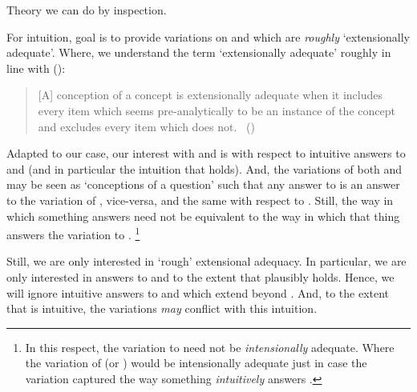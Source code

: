 \begin{note}
  Theory we can do by inspection.
\end{note}

\begin{note}
  For intuition, goal is to provide variations on \qWhy{} and \qHow{} which are \emph{roughly} `extensionally adequate'.
  Where, we understand the term `extensionally adequate' roughly in line with \citeauthor{Sumner:1987aa} (\citeyear{Sumner:1987aa}):

  \begin{quote}
    [A] conception of a concept is extensionally adequate when it includes every item which seems pre-analytically to be an instance of the concept and excludes every item which does not.%
    \mbox{ }\hfill\mbox{(\citeyear[49]{Sumner:1987aa})}
  \end{quote}

  Adapted to our case, our interest with \qWhy{} and \qHow{} is with respect to intuitive answers to \qWhy{} and \qHow{} (and in particular the intuition that \issueInclusion{} holds).
  And, the variations of both \qWhy{} and \qHow{} may be seen as `conceptions of a question' such that any answer to \qWhy{} is an answer to the variation of \qWhy{}, vice-versa, and the same with respect to \qHow{}.
  Still, the way in which something answers \qWhy{} need not be equivalent to the way in which that thing answers the variation to \qWhy{}.%
  \footnote{
    In this respect, the variation to \qWhy{} need not be \emph{intensionally} adequate.
    Where the variation of \qWhy{} (or \qHow{}) would be intensionally adequate just in case the variation captured the way something \emph{intuitively} answers \qWhy{}.
  }

  Still, we are only interested in `rough' extensional adequacy.
  In particular, we are only interested in answers to \qWhy{} and \qHow{} to the extent that \issueInclusion{} plausibly holds.
  Hence, we will ignore intuitive answers to \qWhy{} and \qHow{} which extend beyond \issueInclusion{}.
  And, to the extent that \issueInclusion{} is intuitive, the variations \emph{may} conflict with this intuition.
\end{note}

